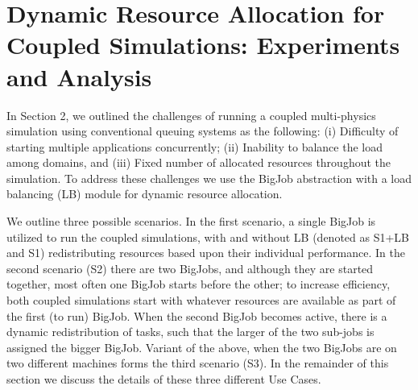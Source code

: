 \documentclass[conference,final]{IEEEtran}
\newcommand{\jhanote}[1]{ {\textcolor{red} { ***Jha: #1 }}}
\newcommand{\skonote}[1]{ {\textcolor{blue} { ***Jeff: #1 }}}
\newcommand{\jhanote}[1]{}
\newcommand{\skonote}[1]{}
\begin{document}
\section{Dynamic Resource Allocation for Coupled Simulations:
  Experiments and Analysis}

In Section 2, we outlined the challenges of running a coupled
multi-physics simulation using conventional queuing systems as the following: (i)
Difficulty of starting multiple applications concurrently; (ii)
Inability to balance the load among domains, and (iii) Fixed number of
allocated resources throughout the simulation. To address these
challenges we use the BigJob abstraction with a load balancing (LB) module
for dynamic resource allocation.



We outline three possible scenarios. In the first
scenario, a single BigJob is utilized to run the coupled simulations, with and without LB (denoted as S1+LB and S1) redistributing resources based upon
their individual performance.  In the second scenario (S2) there are
two BigJobs, and although they are started together, most often one
BigJob starts before the other; to increase efficiency, both coupled
simulations start with whatever resources are available as part of the
first (to run) BigJob. When the second BigJob becomes active, there is
a dynamic redistribution of tasks, such that the larger of the two
sub-jobs is assigned the bigger BigJob. Variant of the above, when
the two BigJobs are on two different machines forms the third scenario
(S3). In the remainder of this section we discuss the details of these
three different Use Cases.


\end{document}
